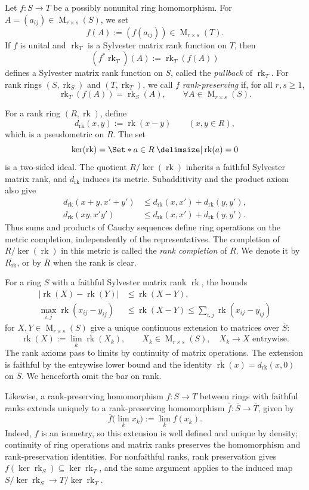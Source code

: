 \documentclass[11pt]{amsart}
\providecommand\given{}
\newcommand\SetSymbol[1][]{%
  \nonscript\:#1\vert\allowbreak\nonscript\:\mathopen{}%
}
\renewcommand\given{\SetSymbol[\delimsize]}#1%
\DeclareMathOperator{\rk}{rk}
\DeclareMathOperator{\Mat}{M}
\theoremstyle{definition}
\theoremstyle{remark}
\begin{document}
Let $f\colon S\to T$ be a possibly nonunital ring homomorphism.
For $A=(a_{ij})\in\Mat_{r\times s}(S)$, we set
\[
 f(A):=(f(a_{ij}))\in\Mat_{r\times s}(T).
\]
If $f$ is unital and $\rk_T$ is a Sylvester matrix rank function on $T$, then
\[
 (f^*\rk_T)(A):=\rk_T(f(A))
\]
defines a Sylvester matrix rank function on $S$, called the \emph{pullback} of
$\rk_T$.
For rank rings $(S,\rk_S)$ and $(T,\rk_T)$, we call $f$
\emph{rank-preserving} if, for all $r,s\geq1$,
\[
 \rk_T(f(A))=\rk_S(A),
 \qquad \forall A\in\Mat_{r\times s}(S).
\]

\medskip
For a rank ring $(R,\rk)$, define
\[
 d_{\rk}(x,y):=\rk(x-y)\qquad(x,y\in R),
\]
which is a pseudometric on \(R\).
The set
\[
 \ker(\rk)=\Set*{a\in R\given\rk(a)=0}
\]
is a two-sided ideal.
The quotient $R/\ker(\rk)$ inherits a faithful Sylvester matrix rank, and $d_{\rk}$ induces its metric.
Subadditivity and the product axiom also give
\[
 \begin{aligned}
 d_{\rk}(x+y,x'+y')&\leq d_{\rk}(x,x')+d_{\rk}(y,y'),\\
 d_{\rk}(xy,x'y')&\leq d_{\rk}(x,x')+d_{\rk}(y,y').
 \end{aligned}
\]
Thus sums and products of Cauchy sequences define ring operations on the
metric completion, independently of the representatives.
The completion of $R/\ker(\rk)$ in this metric is called the
\emph{rank completion} of $R$.  We denote it by $\overline{R_{\rk}}$,
or by $\overline R$ when the rank is clear.

For a ring $S$ with a faithful Sylvester matrix rank \(\rk\), the bounds
\begin{equation}\label{eq:rank-continuity-bounds}
 \begin{aligned}
 |\rk(X)-\rk(Y)|&\leq\rk(X-Y),\\
 \max_{i,j}\rk(x_{ij}-y_{ij})
 &\leq\rk(X-Y)\leq\sum_{i,j}\rk(x_{ij}-y_{ij})
 \end{aligned}
\end{equation}
for $X,Y\in\Mat_{r\times s}(S)$ give a unique continuous extension
to matrices over $\overline S$:
\[
 \overline{\rk}(X):=\lim_k\rk(X_k),
 \qquad X_k\in\Mat_{r\times s}(S),\quad X_k\longrightarrow X
 \text{ entrywise}.
\]
The rank axioms pass to limits by continuity of matrix operations.
The extension is faithful by the entrywise lower bound and the identity
$\overline{\rk}(x)=d_{\rk}(x,0)$ on $\overline S$.
We henceforth omit the bar on rank.

Likewise, a rank-preserving homomorphism $f\colon S\to T$ between rings
with faithful ranks extends uniquely to a rank-preserving homomorphism
$\overline f\colon\overline S\to\overline T$, given by
\[
 \overline f\bigl(\lim_k x_k\bigr):=\lim_k f(x_k).
\]
Indeed, $f$ is an isometry, so this extension is well defined and unique
by density; continuity of ring operations and matrix ranks preserves
the homomorphism and rank-preservation identities.
For nonfaithful ranks, rank preservation gives
$f(\ker\rk_S)\subseteq\ker\rk_T$, and the same argument applies to
the induced map $S/\ker\rk_S\to T/\ker\rk_T$.
\end{document}
